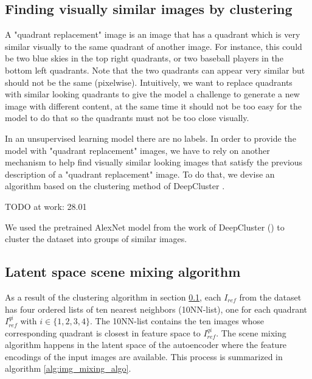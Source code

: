 \documentclass[12pt,a4paper]{article}
\begin{document}
\subsection{Finding visually similar images by clustering} \label{subsec_img_clustering}
A "quadrant replacement" image is an image that has a quadrant which is very similar visually to the same quadrant of another image. For instance, this could be two blue skies in the top right quadrants, or two baseball players in the bottom left quadrants. Note that the two quadrants can appear very similar but should not be the same (pixelwise). Intuitively, we want to replace quadrants with similar looking quadrants to give the model a challenge to generate a new image with different content, at the same time it should not be too easy for the model to do that so the quadrants must not be too close visually.

In an unsupervised learning model there are no labels. In order to provide the model with "quadrant replacement" images, we have to rely on another mechanism to help find visually similar looking images that satisfy the previous description of a "quadrant replacement" image. To do that, we devise an algorithm based on the clustering method of DeepCluster \cite{DeepCluster}.

TODO at work: 28.01


\par We used the pretrained AlexNet model from the work of DeepCluster (\cite{1807.05520}) to cluster the dataset into groups of similar images.


\subsection{Latent space scene mixing algorithm} \label{subsec_img_mixing_algo}
As a result of the clustering algorithm in section \ref{subsec_img_clustering}, each $I_{ref}$ from the dataset has four ordered lists of ten nearest neighbors (10NN-list), one for each quadrant $I^{qi}_{ref}$ with $i \in \{1,2,3,4\}$. The 10NN-list contains the ten images whose corresponding quadrant is closest in feature space to $I^{qi}_{ref}$. The scene mixing algorithm happens in the latent space of the autoencoder where the feature encodings of the input images are available. This process is summarized in algorithm \ref{alg:img_mixing_algo}. 
\end{document}

